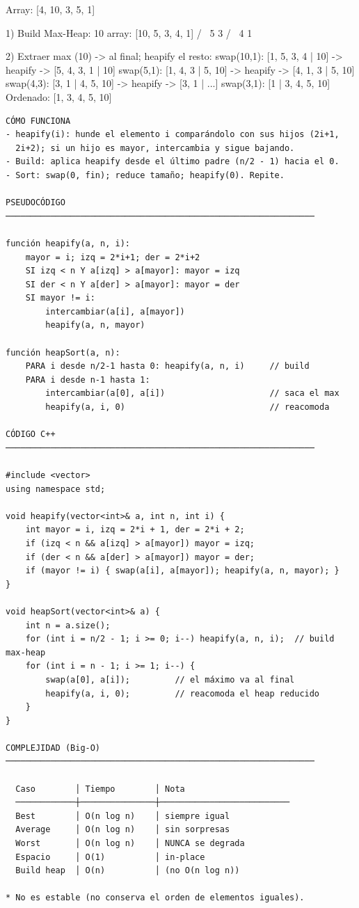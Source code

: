 \begin{dsadiagrama}
Array: [4, 10, 3, 5, 1]

1) Build Max-Heap:
            10                 array: [10, 5, 3, 4, 1]
          /    \
         5      3
        / \
       4   1

2) Extraer max (10) -> al final; heapify el resto:
   swap(10,1): [1, 5, 3, 4 | 10]  -> heapify -> [5, 4, 3, 1 | 10]
   swap(5,1):  [1, 4, 3 | 5, 10]  -> heapify -> [4, 1, 3 | 5, 10]
   swap(4,3):  [3, 1 | 4, 5, 10]  -> heapify -> [3, 1 | ...]
   swap(3,1):  [1 | 3, 4, 5, 10]
   Ordenado: [1, 3, 4, 5, 10]
\end{dsadiagrama}

\begin{lstlisting}
CÓMO FUNCIONA
- heapify(i): hunde el elemento i comparándolo con sus hijos (2i+1,
  2i+2); si un hijo es mayor, intercambia y sigue bajando.
- Build: aplica heapify desde el último padre (n/2 - 1) hacia el 0.
- Sort: swap(0, fin); reduce tamaño; heapify(0). Repite.

PSEUDOCÓDIGO
──────────────────────────────────────────────────────────────

función heapify(a, n, i):
    mayor = i; izq = 2*i+1; der = 2*i+2
    SI izq < n Y a[izq] > a[mayor]: mayor = izq
    SI der < n Y a[der] > a[mayor]: mayor = der
    SI mayor != i:
        intercambiar(a[i], a[mayor])
        heapify(a, n, mayor)

función heapSort(a, n):
    PARA i desde n/2-1 hasta 0: heapify(a, n, i)     // build
    PARA i desde n-1 hasta 1:
        intercambiar(a[0], a[i])                     // saca el max
        heapify(a, i, 0)                             // reacomoda

CÓDIGO C++
──────────────────────────────────────────────────────────────

#include <vector>
using namespace std;

void heapify(vector<int>& a, int n, int i) {
    int mayor = i, izq = 2*i + 1, der = 2*i + 2;
    if (izq < n && a[izq] > a[mayor]) mayor = izq;
    if (der < n && a[der] > a[mayor]) mayor = der;
    if (mayor != i) { swap(a[i], a[mayor]); heapify(a, n, mayor); }
}

void heapSort(vector<int>& a) {
    int n = a.size();
    for (int i = n/2 - 1; i >= 0; i--) heapify(a, n, i);  // build max-heap
    for (int i = n - 1; i >= 1; i--) {
        swap(a[0], a[i]);         // el máximo va al final
        heapify(a, i, 0);         // reacomoda el heap reducido
    }
}

COMPLEJIDAD (Big-O)
──────────────────────────────────────────────────────────────

  Caso        │ Tiempo        │ Nota
  ────────────┼───────────────┼──────────────────────────
  Best        │ O(n log n)    │ siempre igual
  Average     │ O(n log n)    │ sin sorpresas
  Worst       │ O(n log n)    │ NUNCA se degrada
  Espacio     │ O(1)          │ in-place
  Build heap  │ O(n)          │ (no O(n log n))

* No es estable (no conserva el orden de elementos iguales).
\end{lstlisting}

